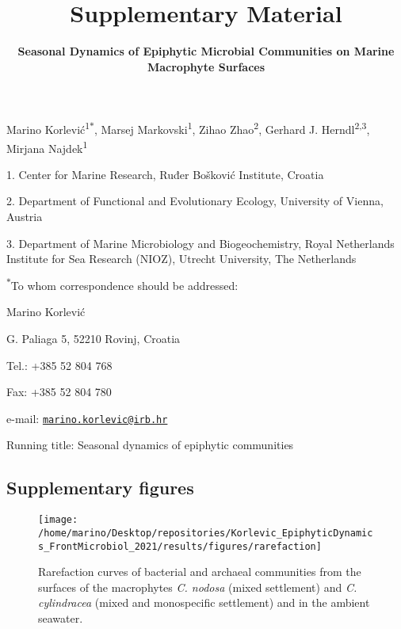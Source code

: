 \documentclass[
  12pt,
]{article}
\title{\textbf{Supplementary Material}}
\subtitle{\textbf{Seasonal Dynamics of Epiphytic Microbial Communities
on Marine Macrophyte Surfaces}}
\author{}
\date{\vspace{-2.5em}}
\begin{document}
\maketitle

\vspace{10mm}

Marino Korlević\textsuperscript{1\(*\)}, Marsej
Markovski\textsuperscript{1}, Zihao Zhao\textsuperscript{2}, Gerhard J.
Herndl\textsuperscript{2,3}, Mirjana Najdek\textsuperscript{1}

1. Center for Marine Research, Ruđer Bošković Institute, Croatia

2. Department of Functional and Evolutionary Ecology, University of
Vienna, Austria

3. Department of Marine Microbiology and Biogeochemistry, Royal
Netherlands Institute for Sea Research (NIOZ), Utrecht University, The
Netherlands

\textsuperscript{\(*\)}To whom correspondence should be addressed:

Marino Korlević

G. Paliaga 5, 52210 Rovinj, Croatia

Tel.: +385 52 804 768

Fax: +385 52 804 780

e-mail:
\href{mailto:marino.korlevic@irb.hr}{\nolinkurl{marino.korlevic@irb.hr}}

Running title: Seasonal dynamics of epiphytic communities

\setlength\parindent{24pt}

\hypertarget{supplementary-figures}{%
\subsection{Supplementary figures}\label{supplementary-figures}}

\begin{figure}[H]

{\centering \texttt{[image: /home/marino/Desktop/repositories/Korlevic\_EpiphyticDynamics\_FrontMicrobiol\_2021/results/figures/rarefaction]} 

}

\caption{Rarefaction curves of bacterial and archaeal communities from the surfaces of the macrophytes \textit{C. nodosa} (mixed settlement) and \textit{C. cylindracea} (mixed and monospecific settlement) and in the ambient seawater.\label{rarefaction}}\label{fig:unnamed-chunk-1}
\end{figure}
\end{document}
